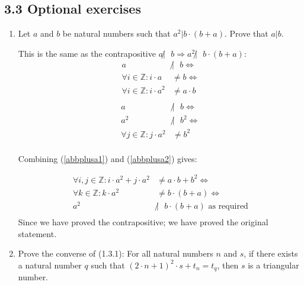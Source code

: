 \documentclass[10pt,\jkfside,a4paper]{article}
\begin{document}
\subsection*{3.3 Optional exercises}

\begin{enumerate}

\item Let $a$ and $b$ be natural numbers such that $a^2 | b \cdot (b + a)$. Prove that $a|b$.

This is the same as the contrapositive $a\not|\text{ } b\Longrightarrow a^2 \not|\text{ } b\cdot (b + a)$:
\begin{equation}\label{abbplusa1}
\begin{split}
a&\not|\text{ } b\Longleftrightarrow\\
\forall i \in \mathbb{Z}: i\cdot a &\neq b\Longleftrightarrow\\
\forall i \in \mathbb{Z}: i\cdot a^2 &\neq a\cdot b\\
\end{split}
\end{equation}
\begin{equation}\label{abbplusa2}
\begin{split}
a&\not|\text{ } b\Longleftrightarrow\\
a^2&\not|\text{ } b^2\Longleftrightarrow\\
\forall j \in \mathbb{Z}: j\cdot a^2 &\neq b^2\\
\end{split}
\end{equation}
\begin{center}
Combining (\ref{abbplusa1}) and (\ref{abbplusa2}) gives:
\end{center}
\begin{equation}\label{abbplusa3}
\begin{split}
\forall i, j \in \mathbb{Z}: i\cdot a^2 + j\cdot a^2 &\neq a\cdot b + b^2\Longleftrightarrow\\
\forall k \in \mathbb{Z}: k\cdot a^2 &\neq b\cdot(b + a)\Longleftrightarrow\\
a^2&\not|\text{ } b \cdot (b + a)\text{ as required}\\
\end{split}
\end{equation}
Since we have proved the contrapositive; we have proved the original statement.

\item Prove the converse of (1.3.1): For all natural numbers $n$ and $s$, if there exists a natural 
number $q$ such that $(2\cdot n + 1)^2\cdot s + t_n = t_q$, then $s$ is a triangular number.


\end{enumerate}
\end{document}
